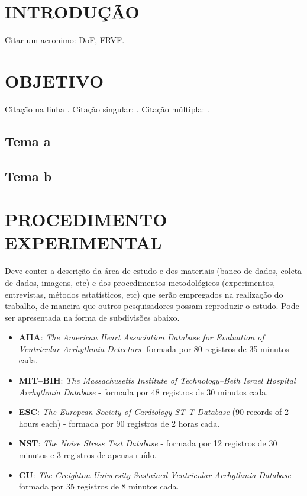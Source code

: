 \chapter{INTRODUÇÃO}
\label{chap:introduction}

Citar um acronimo: \ac{DoF}, \ac{FRVF}.

\lipsum[1-2]

\chapter{OBJETIVO}
\label{chap:objetive}

Citação na linha .
Citação singular: \cite{earnshaw2014virtual}. Citação múltipla: \cite{azuma1997survey, earnshaw2014virtual}.

\section{Tema a}

\lipsum[1]

\section{Tema b}

\lipsum[1]

\chapter{PROCEDIMENTO EXPERIMENTAL} 
\label{chap:methodology}

Deve conter a descrição da área de estudo e dos materiais (banco de dados, coleta de dados, imagens, etc) e dos procedimentos metodológicos (experimentos, entrevistas, métodos estatísticos, etc) que serão empregados na realização do trabalho, de maneira que outros pesquisadores possam reproduzir o estudo. Pode ser apresentada na forma de subdivisões abaixo.

\begin{itemize}
	\item \large \textbf{AHA}: \large \textit{The American Heart Association Database for Evaluation of Ventricular Arrhythmia Detectors}- formada por 80 registros de 35 minutos cada.
	\item \large \textbf{MIT–BIH}: \large \textit{The Massachusetts Institute of Technology–Beth Israel Hospital Arrhythmia Database} - formada por 48 registros de 30 minutos cada.
	\item \large \textbf{ESC}: \large \textit{The European Society of Cardiology ST-T Database} (90 records of 2 hours each) - formada por 90 registros de 2 horas cada.
	\item \large \textbf{NST}: \large \textit{The Noise Stress Test Database} - formada por 12 registros de 30 minutos e 3 registros de apenas ruído.
	\item \large \textbf{CU}: \large \textit{The Creighton University Sustained Ventricular Arrhythmia Database} - formada por 35 registros de 8 minutos cada.
\end{itemize}

